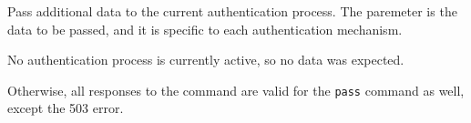 
\begin{reqdesc}
  Pass additional data to the current authentication process. The
   paremeter is the data to be passed, and it is specific
  to each authentication mechanism.
\end{reqdesc}

\noperm

\begin{responses}
  No authentication process is currently active, so no data was
  expected.
\end{responses}
Otherwise, all responses to the  command are valid for
the \texttt{pass} command as well, except the 503 error.
